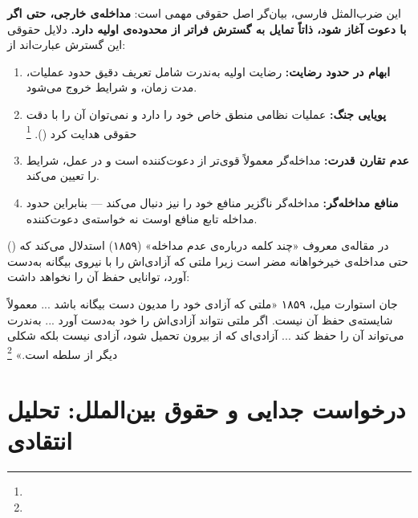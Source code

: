 \begin{tcolorbox}[enemybox, title={«گر رسم شود که مست گیرند، در شهر باید هر آنکه هست گیرند» — تحلیل حقوقی}]
این ضرب‌المثل فارسی، بیان‌گر اصل حقوقی مهمی است: \textbf{مداخله‌ی خارجی، حتی اگر با دعوت آغاز شود، ذاتاً تمایل به گسترش فراتر از محدوده‌ی اولیه دارد.} دلایل حقوقی این گسترش عبارت‌اند از:

\begin{enumerate}[nosep, label=\textbf{\arabic*.}]
  \item \textbf{ابهام در حدود رضایت:} رضایت اولیه به‌ندرت شامل تعریف دقیق حدود عملیات، مدت زمان، و شرایط خروج می‌شود.
  \item \textbf{پویایی جنگ:} عملیات نظامی منطق خاص خود را دارد و نمی‌توان آن را با دقت حقوقی هدایت کرد ().%
  \footnote{}
  \item \textbf{عدم تقارن قدرت:} مداخله‌گر معمولاً قوی‌تر از دعوت‌کننده است و در عمل، شرایط را تعیین می‌کند.
  \item \textbf{منافع مداخله‌گر:} مداخله‌گر ناگزیر منافع خود را نیز دنبال می‌کند — بنابراین حدود مداخله تابع منافع اوست نه خواسته‌ی دعوت‌کننده.
\end{enumerate}
\end{tcolorbox}

 () در مقاله‌ی معروف «چند کلمه درباره‌ی عدم مداخله» (۱۸۵۹) استدلال می‌کند که حتی مداخله‌ی خیرخواهانه مضر است زیرا ملتی که آزادی‌اش را با نیروی بیگانه به‌دست آورد، توانایی حفظ آن را نخواهد داشت:

\begin{histQuote}{جان استوارت میل، ۱۸۵۹}
«ملتی که آزادی خود را مدیون دست بیگانه باشد ... معمولاً شایسته‌ی حفظ آن نیست. اگر ملتی نتواند آزادی‌اش را خود به‌دست آورد ... به‌ندرت می‌تواند آن را حفظ کند ... آزادی‌ای که از بیرون تحمیل شود، آزادی نیست بلکه شکلی دیگر از سلطه است.»%
\footnote{}
\end{histQuote}

\section{درخواست جدایی و حقوق بین‌الملل: تحلیل انتقادی}
\label{sec:ch02-secession}

